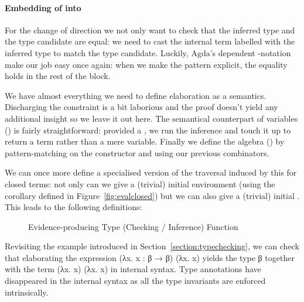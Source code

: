 \paragraph{Embedding of  into } For the change of direction
 we not only want to check that the inferred type and the type candidate
are equal: we need to cast the internal term labelled with the inferred type to
match the type candidate. Luckily, Agda's dependent -notation make our
job easy once again: when we make the pattern  explicit, the equality holds
in the rest of the block.
\begin{agdasnippet}
\end{agdasnippet}

We have almost everything we need to define elaboration as a semantics. Discharging
the  constraint is a bit laborious and the proof doesn't
yield any additional insight so we leave it out here. The semantical counterpart of
variables () is fairly straightforward: provided a , we run the
inference and touch it up to return a term rather than a mere variable. Finally we
define the algebra () by pattern-matching on the constructor and using our
previous combinators. 

We can once more define a specialised version of the traversal induced by this
 for closed terms: not only can we give a (trivial) initial
environment (using the  corollary defined in Figure~\ref{fig:evalclosed})
but we can also give a (trivial) initial . This leads to the
following definitions:

\begin{figure}[h]
\begin{minipage}{0.45\textwidth}
\end{minipage}\hfill
\begin{minipage}{0.45\textwidth}
\end{minipage}
\caption{Evidence-producing Type (Checking / Inference) Function}
\end{figure}

Revisiting the example introduced in Section~\ref{section:typechecking},
we can check that elaborating the expression {(λx. x : β → β) (λx. x)}
yields the type {β} together with the term {(λx. x) (λx. x)} in internal
syntax. Type annotations have disappeared in the internal syntax as all
the type invariants are enforced intrinsically.

\begin{figure}[h]
\end{figure}
